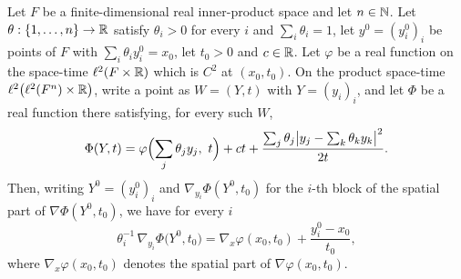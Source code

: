 \begin{lemma}
Let $F$ be a finite-dimensional real inner-product space and let $n\in\mathbb{N}$. Let
$\theta:\{1,\dots,n\}\to\mathbb{R}$ satisfy $\theta_i>0$ for every $i$ and $\sum_i\theta_i=1$,
let $y^0=(y^0_i)_i$ be points of $F$ with $\sum_i\theta_iy^0_i=x_0$, let $t_0>0$ and
$c\in\mathbb{R}$. Let $\varphi$ be a real function on the space-time $\ell^2(F\times\mathbb{R})$ which is
$C^2$ at $(x_0,t_0)$. On the product space-time $\ell^2\bigl(\ell^2(F^n)\times\mathbb{R}\bigr)$,
write a point as $W=(Y,t)$ with $Y=(y_i)_i$, and let $\Phi$ be a real function there
satisfying, for every such $W$,
\[
  \Phi(Y,t)=\varphi\Bigl(\sum_j\theta_jy_j,\ t\Bigr)+ct
    +\frac{\sum_j\theta_j\bigl|y_j-\sum_k\theta_ky_k\bigr|^2}{2t}.
\]
Then, writing $Y^0=(y^0_i)_i$ and $\nabla_{y_i}\Phi(Y^0,t_0)$ for the $i$-th block of the
spatial part of $\nabla\Phi(Y^0,t_0)$, we have for every $i$
\[
  \theta_i^{-1}\,\nabla_{y_i}\Phi\bigl(Y^0,t_0\bigr)
    =\nabla_x\varphi(x_0,t_0)+\frac{y^0_i-x_0}{t_0},
\]
where $\nabla_x\varphi(x_0,t_0)$ denotes the spatial part of $\nabla\varphi(x_0,t_0)$.
\end{lemma}
